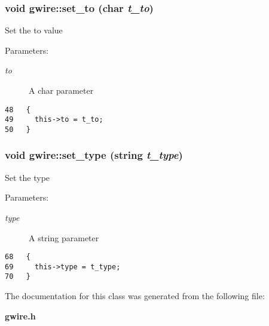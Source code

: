 \subsubsection{\setlength{\rightskip}{0pt plus 5cm}void gwire::set\_\-to (char {\em t\_\-to})\hspace{0.3cm}{\tt  [inline]}}\label{classgwire_20b455bf23110afaf1af37d6f4b280d9}


Set the to value

\begin{Desc}
\item[Parameters:]
\begin{description}
\item[{\em to}]A char parameter \end{description}
\end{Desc}


\begin{Code}\begin{verbatim}48   {
49     this->to = t_to;
50   }
\end{verbatim}\end{Code}


\subsubsection{\setlength{\rightskip}{0pt plus 5cm}void gwire::set\_\-type (string {\em t\_\-type})\hspace{0.3cm}{\tt  [inline]}}\label{classgwire_c57ccf4197b84bf0f66e9e25b739fdb5}


Set the type

\begin{Desc}
\item[Parameters:]
\begin{description}
\item[{\em type}]A string parameter \end{description}
\end{Desc}


\begin{Code}\begin{verbatim}68   {
69     this->type = t_type;
70   }
\end{verbatim}\end{Code}




The documentation for this class was generated from the following file:\begin{CompactItemize}
\item 
\bf{gwire.h}\end{CompactItemize}
